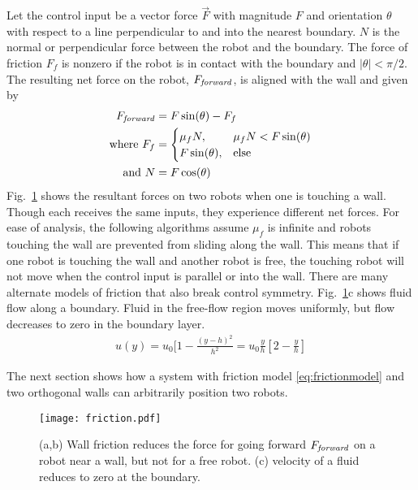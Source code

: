 Let the control input be a vector force $\vec{F}$ with magnitude $F$ and orientation $\theta$ with respect to a line perpendicular to and into the nearest boundary. $N$ is the normal or perpendicular force between the robot and the boundary. The force of friction $F_f$ is nonzero if the robot is in contact with the boundary and  $|\theta| < \pi/2$. The resulting net force on the robot, $F_{\text{\emph{forward}}}$, is aligned with the wall and given by
\begin{align}
F_{\text{\emph{forward}}} &=  F \sin(\theta) - F_f  \nonumber \\
\text{where }  F_f &= \begin{cases}  \mu_f N, &  \mu_f N < F \sin(\theta)  \label{eq:frictionmodel}  \\
F \sin(\theta), & \text{else} \end{cases} \\ %
\text{and } N &= F \cos(\theta) \nonumber
\end{align}
 Fig.~\ref{fig:friction} shows the resultant forces on two robots when one is touching a wall. 
Though each receives the same inputs,  they experience different net forces.
  For ease of analysis, the following algorithms assume $\mu_f$ is infinite and robots touching the wall are prevented from sliding along the wall.
This means that if one robot is touching the wall and another robot is free, the touching robot will not move when the control input is parallel or into the wall. 
There are many alternate models of friction that also break control symmetry. Fig.~\ref{fig:friction}c shows fluid flow along a boundary.  Fluid in the free-flow region moves uniformly, but flow decreases to zero in the boundary layer.  
\begin{align}
u(y) = u_0 [1- \frac{(y-h)^2}{h^2} = u_0 \frac{y}{h} [2- \frac{y}{h}] \label{eq:boundarylayerflow}
\end{align}

The next section shows how a system with friction model \eqref{eq:frictionmodel} and two orthogonal walls can arbitrarily position two robots. 
\begin{figure}[h]
\begin{center}
\texttt{[image: friction.pdf]} 
\vspace{-1em}
\caption{(a,b) Wall friction reduces the force for going forward $F_{\text{\emph{forward}}}$ on a robot near a wall, but not for a free robot. (c) velocity of a fluid reduces to zero at the boundary.}
\label{fig:friction}
\end{center}
\end{figure} 



